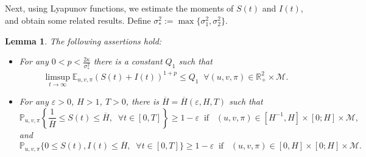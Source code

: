 \documentclass[12pt]{amsart}
\newtheorem{lem}{Lemma}[section]
\theoremstyle{remark}
\numberwithin{equation}{section}
\newcommand{\eps}{\varepsilon}
\newcommand{\M}{\mathcal{M}}
\newcommand{\E}{\mathbb{E}}
\newcommand{\PP}{\mathbb{P}}
\newcommand{\R}{\mathbb{R}}
\numberwithin{equation}{section}
\newcommand{\PPi}{\PP_{u,v,\pi}}
\newcommand{\Ei}{\E_{u,v,\pi}}
\newcommand{\1}{\boldsymbol{1}}
\def\bar{\overline}
\begin{document}
Next, using Lyapunov functions, we estimate the moments of $S(t)$  and $I(t)$, and obtain some related results. Define $\sigma_*^2:=\max\{\sigma_1^2,\sigma_2^2\}$.

\begin{lem}\label{lem2.1}
The following assertions hold:
\begin{itemize}
\item[{\rm(i)}] For any $0<p<\frac{2\kappa}{\sigma_*^2}$ there is a constant $Q_1$ such that
$$\limsup\limits_{t\to\infty}\Ei (S(t)+ I(t))^{1+p}\leq Q_1\;\; \forall (u,v,\pi) \in \R_+^2\times\M.$$
\item[{\rm(ii)}] For any $\eps>0$, $H>1$, $T>0$, there is $\bar H =\bar H(\eps, H, T)$ such that
$$\PPi \left\{\dfrac{1}{\bar H}  \leq S(t)
 \leq \bar H, \;\;\forall t \in [0,T] \right\}\geq 1-\eps \;\; \text{if}\;\;\; (u,v,\pi) \in [H^{-1},H]\times [0;H]\times\M,$$
and
$$\PPi\{ 0 \leq S(t), I(t) \leq \bar H, \;\;\forall t \in [0,T] \}\geq 1-\eps \;\; \text{if}\;\;\; (u,v,\pi) \in [0,H]\times [0;H]\times\M.$$
\end{itemize}
\end{lem}
\end{document}
